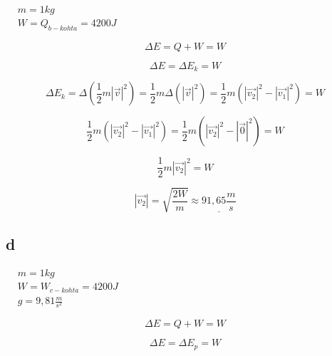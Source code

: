 \documentclass[12pt,a4paper,finnish]{article}
\begin{document}
\begin{math}
 \begin{aligned}
  &m = 1 kg\\
  &W = Q_{b-kohta} = 4200 J
 \end{aligned}
\end{math}

\begin{equation}
 \Delta E = Q + W = W
\end{equation}

\begin{equation}
 \Delta E = \Delta E_k = W
\end{equation}

\begin{equation}
 \Delta E_k = \Delta \left(\frac{1}{2}m|\vec{v}|^2\right) = \frac{1}{2}m\Delta\left(|\vec{v}|^2\right) = 
  \frac{1}{2}m\left(|\vec{v_2}|^2 -|\vec{v_1}|^2\right) = W
\end{equation}

\begin{equation}
 \frac{1}{2}m\left(|\vec{v_2}|^2 -|\vec{v_1}|^2\right) = \frac{1}{2}m\left(|\vec{v_2}|^2 -|\vec{0}|^2\right)
  = W
\end{equation}

\begin{equation}
 \frac{1}{2}m|\vec{v_2}|^2= W
\end{equation}

\begin{equation}
 |\vec{v_2}| = \sqrt{\frac{2W}{m}} \approx \underline{91,65 \frac{m}{s}}
\end{equation}

\subsection{d}

\begin{math}
 \begin{aligned}
  &m = 1 kg\\
  &W = W_{c-kohta} = 4200 J\\
  &g = 9,81 \frac{m}{s^2}
 \end{aligned}
\end{math}

\begin{equation}
 \Delta E = Q + W = W
\end{equation}

\begin{equation}
 \Delta E = \Delta E_p = W
\end{equation}
\end{document}
